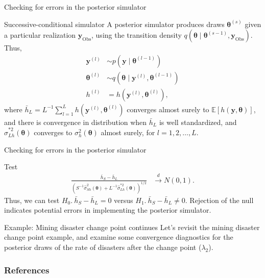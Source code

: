 \documentclass[12pt, compress]{beamer}
\begin{document}
\begin{frame}{Checking for errors in the posterior simulator}
	\begin{block}{Successive-conditional simulator}
A posterior simulator produces draws $\bm{\theta}^{(s)}$ given a particular realization $\bm{y}_{\text{Obs}}$, using the transition density $q(\bm{\theta}\mid \bm{\theta}^{(s-1)},\bm{y}_{\text{Obs}})$. Thus, 
\begin{align*}
	\bm{y}^{(l)} &\sim p(\bm{y}\mid \bm{\theta}^{(l-1)})\\
	\bm{\theta}^{(l)} &\sim q(\bm{\theta}\mid \bm{y}^{(l)},\bm{\theta}^{(l-1)})\\
	h^{(l)} &= h(\bm{y}^{(l)},\bm{\theta}^{(l)}), 
\end{align*}
where $\bar{h}_L=L^{-1}\sum_{l=1}^L h(\bm{y}^{(l)},\bm{\theta}^{(l)})$ converges almost surely to $\mathbb{E}[h(\bm{y},\bm{\theta})]$, and there is convergence in distribution when $\bar{h}_L$ is well standardized, and $\hat{\sigma}^{*2}_{Lh}(\bm{\theta})$ converges to ${\sigma}^2_h(\bm{\theta})$ almost surely, for $l=1,2,\dots,L$.
	\end{block}
\end{frame}


\begin{frame}{Checking for errors in the posterior simulator}
	\begin{block}{Test}
\begin{align*}
	\frac{\bar{h}_S-\bar{h}_L}{\left(S^{-1}\hat{\sigma}^2_{Sh}(\bm{\theta})+L^{-1}\hat{\sigma}^{*2}_{Lh}(\bm{\theta})\right)^{1/2}} &\stackrel{d}{\rightarrow} N(0,1).
\end{align*}
Thus, we can test $H_0. \ \bar{h}_S-\bar{h}_L=0$ versus $H_1. \ \bar{h}_S-\bar{h}_L\neq 0$. Rejection of the null indicates potential errors in implementing the posterior simulator.
	\end{block}
\end{frame}

\begin{frame}{Example: Mining disaster change point continues}
Let's revisit the mining disaster change point example, and examine some convergence diagnostics for the posterior draws of the rate of disasters after the change point ($\lambda_2$).
\end{frame}

\begin{frame}[allowframebreaks]
	\frametitle{References}
		{\footnotesize
		
		}
\end{frame}
	
\end{document}

